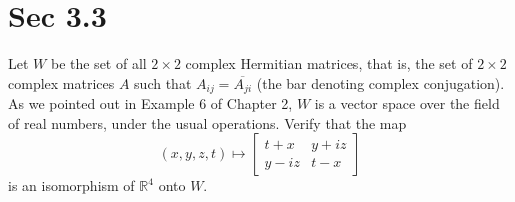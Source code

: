 \section*{Sec 3.3}

\begin{problem*}
Let \(W\) be the set of all \(2\times 2\) complex Hermitian matrices, that is, the set of \(2\times 2\) complex matrices \(A\) such that \(A_{ij}=\overline{A_{ji}}\) (the bar denoting complex conjugation). As we pointed out in Example 6 of Chapter 2, \(W\) is a vector space over the field of real numbers, under the usual operations. Verify that the map
\[
(x,y,z,t)\longmapsto
\begin{bmatrix}
t+x & y + i z\\[4pt]
y - i z & t - x
\end{bmatrix}
\]
is an isomorphism of \(\mathbb{R}^4\) onto \(W\).
\end{problem*}

